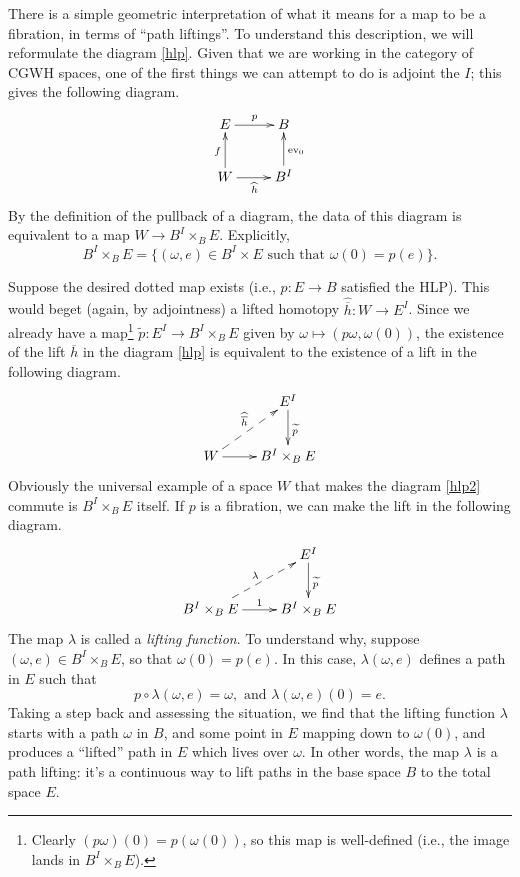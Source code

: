 There is a simple geometric interpretation of what it means for a map to be a fibration, in terms of ``path liftings''.
To understand this description, we will reformulate the diagram \eqref{hlp}.
Given that we are working in the category of CGWH spaces, one of the first things we can attempt to do is adjoint the $I$;
this gives the following diagram.
\begin{equation}\label{hlp2}
    \xymatrix{
	E\ar[r]^p & B\\
	W\ar[u]^f\ar[r]_{\widehat{h}} & B^I\ar[u]_{\mathrm{ev}_0}
    }
\end{equation}
By the definition of the pullback of a diagram, the data of this diagram is equivalent to a map $W\to B^I\times_B E$.
Explicitly,
$$B^I\times_B E = \{(\omega, e) \in B^I\times E \text{ such that } \omega(0) = p(e)\}.$$

Suppose the desired dotted map exists (i.e., $p:E\to B$ satisfied the HLP).
This would beget (again, by adjointness) a lifted homotopy $\widehat{\overline{h}}:W\to E^I$.
Since we already have a map\footnote{Clearly $(p\omega)(0) = p(\omega(0))$, so this map is well-defined
(i.e., the image lands in $B^I\times_B E$).} $\widetilde{p}:E^I\to B^I\times_B E$ given by $\omega\mapsto (p\omega,\omega(0))$,
the existence of the lift $\overline{h}$ in the diagram \eqref{hlp} is equivalent to the existence of a lift in
the following diagram.
\begin{equation*}
    \xymatrix{
	& E^I\ar[d]^{\widetilde{p}}\\
	W\ar[r]\ar@{-->}[ur]^{\widehat{\overline{h}}} & B^I\times_B E
    }
\end{equation*}
Obviously the universal example of a space $W$ that makes the diagram \eqref{hlp2} commute is $B^I\times_B E$ itself.
If $p$ is a fibration, we can make the lift in the following diagram.
\begin{equation*}
    \xymatrix{
	& E^I\ar[d]^{\widetilde{p}}\\
	B^I\times_B E\ar@{-->}[ur]^\lambda\ar[r]^1 & B^I\times_B E
    }
\end{equation*}
The map $\lambda$ is called a \emph{lifting function}.
To understand why, suppose $(\omega, e) \in B^I\times_B E$, so that $\omega(0) = p(e)$.
In this case, $\lambda(\omega,e)$ defines a path in $E$ such that
$$p\circ\lambda(\omega, e) = \omega,\text{ and }\lambda(\omega,e)(0) = e.$$
Taking a step back and assessing the situation, we find that the lifting function $\lambda$ starts with a path
$\omega$ in $B$, and some point in $E$ mapping down to $\omega(0)$,
and produces a ``lifted'' path in $E$ which lives over $\omega$.
In other words, the map $\lambda$ is a path lifting: it's a continuous way to lift paths in the base space $B$ to
the total space $E$. 

